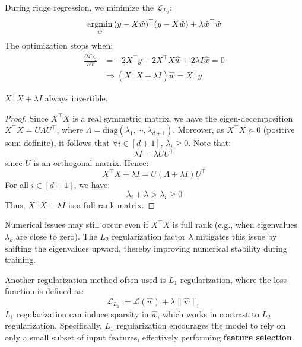 \documentclass[../main]{subfiles}
\begin{document}
During ridge regression, we minimize the $\mathcal L_{L_2}$:
\begin{equation}
    \mathop{\mathrm{argmin}}_{\hat w}\,(y-X\hat w)^\top(y-X\hat w)+\lambda\hat w^\top \hat w
\end{equation}
The optimization stops when:
\begin{align}
  \frac{\partial \mathcal L_{L_2}}{\partial \hat w}&=-2X^\top y+2X^\top X\hat w+2\lambda I\hat w=0\\
  &\Rightarrow (X^\top X+\lambda I)\hat w=X^\top y
\end{align} 
\begin{proposition}
$X^\top X+\lambda I$ always invertible.
\end{proposition}
\begin{proof}
  Since $X^\top X$ is a real symmetric matrix, we have the eigen-decomposition
  $X^\top X=U\Lambda U^\top$, where $\Lambda=\mathrm{diag}(\lambda_1,\cdots,\lambda_{d+1})$.  
  Moreover, as $X^\top X\succeq 0$ (positive semi-definite), it follows that $\forall i\in [d+1],\,\lambda_i\ge 0$.  
  Note that:
  \begin{equation}
      \lambda I=\lambda UU^\top
  \end{equation}
  since $U$ is an orthogonal matrix. Hence:
  \begin{equation}
      X^\top X+\lambda I=U(\Lambda+\lambda I)U^\top
  \end{equation}
  For all $i\in[d+1]$, we have:
  \begin{equation}
      \lambda_i+\lambda>\lambda_i\ge 0 
  \end{equation}
  Thus, $X^\top X+\lambda I$ is a full-rank matrix.
\end{proof}
\begin{remark}
  Numerical issues may still occur even if $X^\top X$ is full rank (e.g., when eigenvalues $\lambda_k$ are close to zero).  
  The $L_2$ regularization factor $\lambda$ mitigates this issue by shifting the eigenvalues upward, thereby improving numerical stability during training.
\end{remark}

Another regularization method often used is $L_1$ regularization, where the loss function is defined as:
\begin{equation}
    \mathcal L_{L_1}:=\mathcal L(\hat w)+\boxed{\lambda\|\hat w\|_1}
\end{equation}
$L_1$ regularization can induce sparsity in $\hat w$, which works in contrast to $L_2$ regularization.  
Specifically, $L_1$ regularization encourages the model to rely on only a small subset of input features, effectively performing \textbf{feature selection}.
\end{document}
